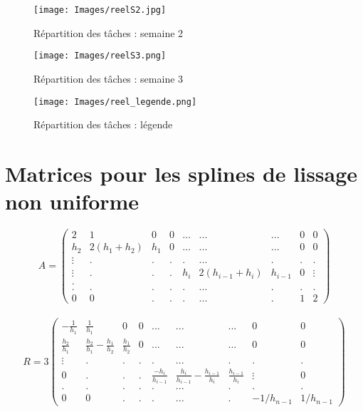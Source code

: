 \documentclass[a4paper,12pt]{article} %
\begin{document}
        	\begin{figure}[H]
        	    \centering
        	    \texttt{[image: Images/reelS2.jpg]}
        	    \caption{Répartition des tâches : semaine 2}
        	\end{figure}
        	
        	\begin{figure}[H]
        	    \centering
        	    \texttt{[image: Images/reelS3.png]}
        	    \caption{Répartition des tâches : semaine 3}
        	\end{figure}

        	\begin{figure}[H]
        	    \centering
        	    \texttt{[image: Images/reel\_legende.png]}
        	    \caption{Répartition des tâches : légende}
        	\end{figure}
        	
    
    \section{\label{annexe3}Matrices pour les splines de lissage non uniforme}
    
                 $$A=\begin{pmatrix} 2&1&0&0&...&...&...&0&0 \\ h_2&2(h_1+h_2)&h_1&0&...&...&...&0&0 \\ \vdots&.&.&.&.&...&.&.&.\\ \vdots&.&.&.&h_i&2(h_{i-1}+h_i)&h_{i-1}&0&\vdots \\. \\.&.&.&.&.&...&.&.&. \\ 0&0&.&.&.&...&.&1&2 \end{pmatrix}$$\\
                
                $$R=3\begin{pmatrix} -\frac{1}{h_1}&\frac{1}{h_1}&0&0&...&...&...&0&0 \\ \frac{h_2}{h_1}&\frac{h_2}{h_1}-\frac{h_1}{h_2}&\frac{h_1}{h_2}&0&...&...&...&0&0 \\ \vdots&.&.&.&.&...&.&.&.\\ 0&.&.&.&\frac{-h_i}{h_{i-1}}&\frac{h_i}{h_{i-1}}-\frac{h_{i-1}}{h_i}&\frac{h_{i-1}}{h_i}&\vdots&0 \\.&.&.&.&.&...&.&.&. \\ 0&0&.&.&.&...&.&-1/h_{n-1}&1/h_{n-1} \end{pmatrix}$$\\
                
\end{document}
